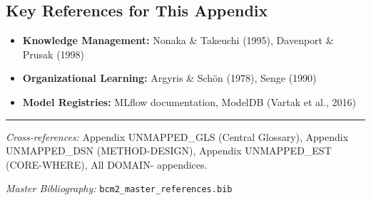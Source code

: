 \vspace{0.5em}

\subsection{Key References for This Appendix}

\begin{itemize}[nosep]
    \item \textbf{Knowledge Management:} Nonaka \& Takeuchi (1995), Davenport \& Prusak (1998)
    \item \textbf{Organizational Learning:} Argyris \& Schön (1978), Senge (1990)
    \item \textbf{Model Registries:} MLflow documentation, ModelDB (Vartak et al., 2016)
\end{itemize}

\nocite{bcm_master}



\vspace{1em}
\hrule
\vspace{0.5em}

\noindent\textit{Cross-references:}
Appendix UNMAPPED_GLS (Central Glossary),
Appendix UNMAPPED_DSN (METHOD-DESIGN),
Appendix UNMAPPED_EST (CORE-WHERE),
All DOMAIN- appendices.

\noindent\textit{Master Bibliography:} \texttt{bcm2\_master\_references.bib}


